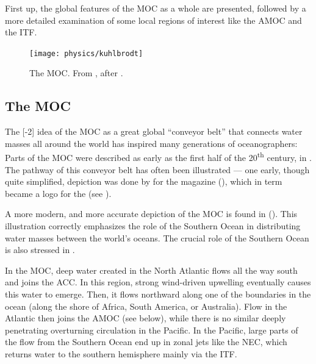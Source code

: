 First up, the global features of the \ac{MOC} as a whole are presented, followed by a more detailed examination of some local regions of interest like the \ac{AMOC} and the \ac{ITF}.

\begin{figure}
	\begin{whole}
		\texttt{[image: physics/kuhlbrodt]}
	\end{whole}
	\caption{The \ac{MOC}. From \cite{kuhlbrodt}, after \cite{rahmstorf}.}
	\label{fig:kuhlbrodt-moc}
\end{figure}

\subsection{The \acf{MOC}}
The%
[-2]%
idea of the \ac{MOC} as a great global \enquote{conveyor belt} that connects water masses all around the world has inspired many generations of oceanographers: Parts of the \ac{MOC} were described as early as the first half of the \num{20}\textsuperscript{th} century, \eg in \cite{wuest}. The pathway of this conveyor belt has often been illustrated --- one early, though quite simplified, depiction was done by \citeauthor{broecker} for the  magazine (), which in term became a logo for the  (see \cite{broecker}).

A more modern, and more accurate depiction of the \ac{MOC} is found in \cite{kuhlbrodt} (). This illustration correctly emphasizes the role of the Southern Ocean in distributing water masses between the world's oceans. The crucial role of the Southern Ocean is also stressed in \cite{marshall}.

In the \ac{MOC}, deep water created in the North Atlantic flows all the way south and joins the \ac{ACC}. In this region, strong wind-driven upwelling eventually causes this water to emerge. Then, it flows northward along one of the boundaries in the ocean (along the shore of Africa, South America, or Australia). Flow in the Atlantic then joins the \ac{AMOC} (see below), while there is no similar deeply penetrating overturning circulation in the Pacific. In the Pacific, large parts of the flow from the Southern Ocean end up in zonal jets like the \ac{NEC}, which returns water to the southern hemisphere mainly via the \ac{ITF}.

